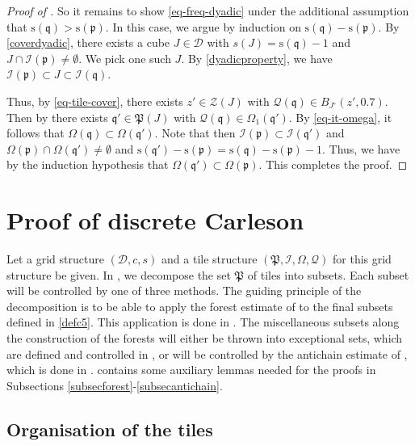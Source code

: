 \documentclass[10pt,a4paper]{article}
\theoremstyle{plain}
\theoremstyle{definition}
\numberwithin{equation}{subsection}
\newcommand{\fp}{{\mathfrak p}}
\newcommand{\fP}{{\mathfrak P}}
\newcommand{\fq}{{\mathfrak q}}
\newcommand{\ps}{{\mathrm{s}}}
\newcommand{\fc}{{\Omega}}
\newcommand{\scI}{{\mathcal{I}}} %
\newcommand{\fcc}{{\mathcal{Q}}}
\begin{document}
\begin{proof}[Proof of ]
    So it remains to show \eqref{eq-freq-dyadic} under the additional assumption that $\ps(\fq) > \ps(\fp)$. In this case, we argue by induction on $\ps(\fq)-\ps(\fp)$. By \eqref{coverdyadic}, there exists a cube $J \in \mathcal{D}$ with $s(J) = \ps(\fq) - 1$ and $J \cap\scI(\fp) \ne \emptyset$. We pick one such $J$. By \eqref{dyadicproperty}, we have $\scI(\fp) \subset J \subset \scI(\fq)$.

    Thus, by \eqref{eq-tile-cover}, there exists $z' \in \mathcal{Z}(J)$ with $\fcc(\fq) \in B_{J^\circ}(z', 0.7)$. Then by  there exists $\fq' \in \fP(J)$ with $\fcc(\fq) \in\Omega_1(\fq')$.
    By \eqref{eq-it-omega}, it follows that $\Omega(\fq) \subset \Omega(\fq')$. Note that then $\scI(\fp) \subset \scI(\fq')$ and $\fc(\fp) \cap \fc(\fq') \ne \emptyset$ and $\ps(\fq') - \ps(\fp) = \ps(\fq) - \ps(\fp) - 1$. Thus, we have by the induction hypothesis that $\Omega(\fq') \subset \Omega(\fp)$. This completes the proof.
\end{proof}

\section{Proof of discrete Carleson}
\label{proptopropprop}



Let a grid structure $(\mathcal{D}, c, s)$ and a tile structure $(\fP, \scI, \fc, \fcc)$ for this grid structure be given. In , we decompose the set $\fP$ of tiles into subsets. Each subset will be controlled by one of three methods. The guiding principle of the decomposition is to be able to apply the forest estimate of  to the final subsets defined in \eqref{defc5}. This application is done in . The miscellaneous subsets along the construction of the forests will either be thrown into exceptional sets, which are defined and controlled in , or will be controlled by the antichain estimate of , which is done in .  contains some auxiliary lemmas needed for the proofs in Subsections \ref{subsecforest}-\ref{subsecantichain}.

\subsection{Organisation of the tiles}\label{subsectilesorg}
\end{document}

